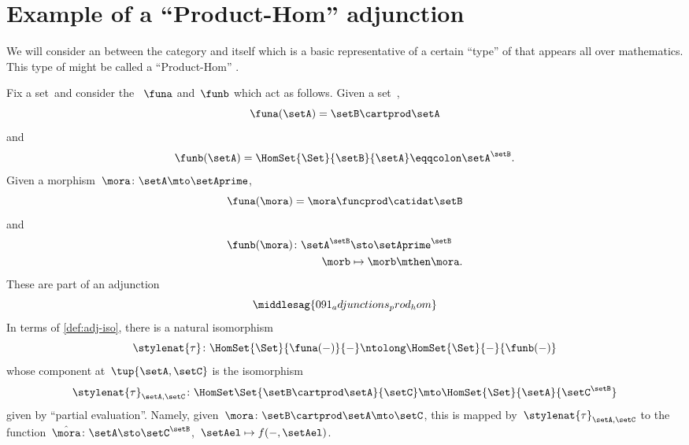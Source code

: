 
\section[Product-Hom adjunction]{Example of a ``Product-Hom'' adjunction}
We will consider an  between the category \Set and itself which is a basic representative of a certain ``type'' of  that appears all over mathematics.
This type of  might be called a ``Product-Hom'' .

Fix a set~\setB and consider the ~$\funa$ and~$\funb$ which act as follows.
Given a set~\setA,
\begin{equation}
    \funa(\setA) = \setB \cartprod \setA
\end{equation}
and
\begin{equation}
    \funb(\setA) = \HomSet{\Set}{\setB}{\setA} \eqqcolon \setA^\setB.
\end{equation}
Given a morphism~$\mora\colon \setA \mto \setAprime$,
\begin{equation}
    \funa(\mora) = \mora \funcprod \catidat\setB
\end{equation}
and
\begin{equation}
    \begin{aligned}
        \funb(\mora)\colon \setA^\setB & \sto \setAprime^\setB \\
        \morb                          & \mapsto \morb \mthen \mora.
    \end{aligned}
\end{equation}
%
These  are part of an adjunction
%
\begin{equation}
    \middlesag{091_adjunctions_prod_hom}
\end{equation}
In terms of \cref{def:adj-iso}, there is a natural isomorphism
\begin{equation}
    \stylenat{\tau}\colon \HomSet{\Set}{\funa(- )}{-}  \ntolong   \HomSet{\Set}{-}{\funb( - )}
\end{equation}
whose component at~$\tup{\setA,\setC}$ is the isomorphism
\begin{equation}
    \stylenat{\tau}_{\setA,\setC} \colon \HomSet\Set{\setB\cartprod \setA}{\setC} \mto \HomSet{\Set}{\setA}{\setC^\setB}
\end{equation}
given by ``partial evaluation''.
Namely, given~$\mora \colon \setB \cartprod \setA \mto \setC$, this is mapped by~$\stylenat{\tau}_{\setA,\setC}$ to the function~$\hat \mora \colon \setA \sto \setC^\setB$,~$\setAel \mapsto f( -, \setAel)$.

